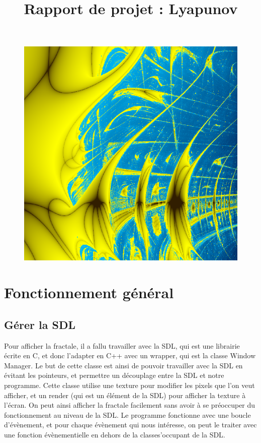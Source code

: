 \documentclass{article}
\title{Rapport de projet : Lyapunov}
\date{}
\begin{document}
	\vspace*{-2pt}
	{\let\newpage\relax\maketitle} \thispagestyle{fancy}
	\vspace{-2cm}
	\begin{figure}[!h]
		\centering
		\includegraphics[scale=0.3]{zircon}
	\end{figure}
	\tableofcontents
	\section{Fonctionnement général}
	\subsection{Gérer la SDL}
	Pour afficher la fractale, il a fallu travailler avec la SDL, qui est une librairie écrite en C, et donc l'adapter en C++ avec un wrapper, qui est la classe Window Manager.
	Le but de cette classe est ainsi de pouvoir travailler avec la SDL en évitant les pointeurs, et permettre un découplage entre la SDL et notre programme.
	Cette classe utilise une texture pour modifier les pixels que l'on veut afficher, et un render (qui est un élément de la SDL) pour afficher la texture à l'écran.
	On peut ainsi afficher la fractale facilement sans avoir à se préoccuper du fonctionnement au niveau de la SDL.
	Le programme fonctionne avec une boucle d'évènement, et pour chaque évènement qui nous intéresse, on peut le traiter avec une fonction évènementielle en dehors de la classes'occupant de la SDL.
\end{document}
